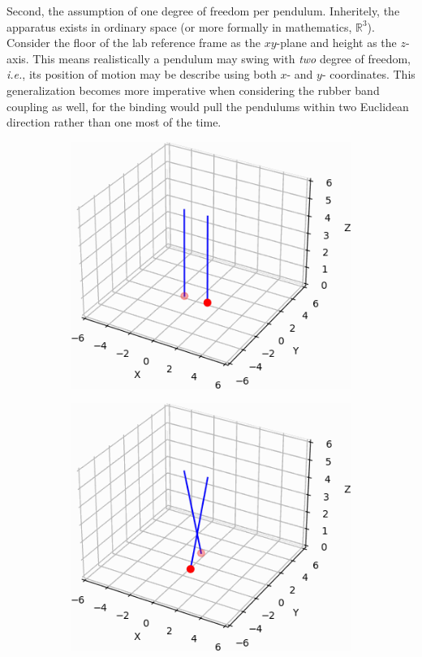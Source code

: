 \documentclass[12pt]{article}
\newcommand{\R}{\mathbb{R}}
\begin{document}
\begin{multicols}{2}
Second, the assumption of one degree of freedom per pendulum. Inheritely, the apparatus exists in ordinary space
(or more formally in mathematics, $\R^3$). Consider the floor of the lab reference frame as the $xy$-plane and height
as the $z$-axis. This means realistically a pendulum may swing with \textit{two} degree of freedom, \textit{i.e.},
its position of motion may be describe using both $x$- and $y$- coordinates. This generalization becomes more imperative when
considering the rubber band coupling as well, for the binding would pull the pendulums within two Euclidean direction rather than one most of the time.
\columnbreak
\begin{figure}[H]
    \centering
    \begin{subfigure}{0.32\linewidth}
        \centering
        \includegraphics[width=0.98\linewidth]{figs/fig2/a_cropped.png}
        \caption{}
    \end{subfigure}
    \begin{subfigure}{0.32\linewidth}
        \centering
        \includegraphics[width=0.98\linewidth]{figs/fig2/b_cropped.png}

\end{subfigure}
\end{figure}
\end{multicols}
\end{document}
